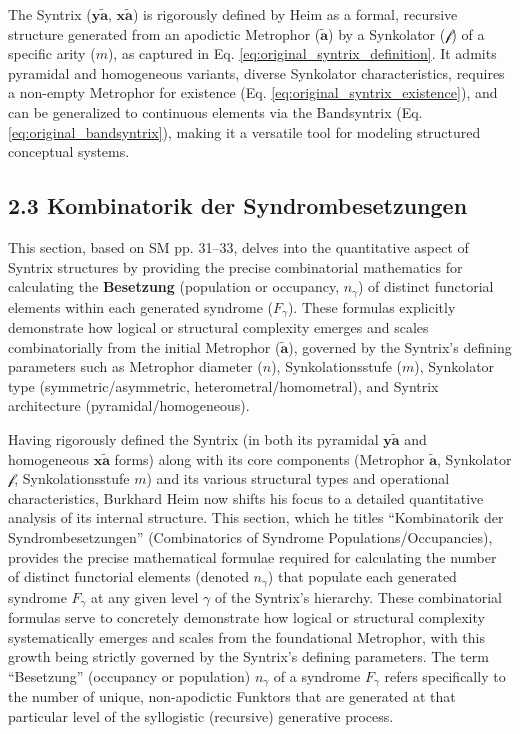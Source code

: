 \documentclass[12pt]{article}
\newcommand{\q}[1]{\enquote{#1}}
\newcommand{\syntrix}{\bm{y\widetilde{a}}}
\newcommand{\homogeneoussyntrix}{\bm{x\widetilde{a}}}
\newcommand{\metrophor}{\bm{\widetilde{a}}}
\newcommand{\synkolator}{\mathcal{f}}
\newcommand{\synkolationsstufe}{m}
\newcommand{\syndrom}{F}
\begin{document}
The Syntrix (\(\syntrix\), \(\homogeneoussyntrix\)) is rigorously defined by Heim as a formal, recursive structure generated from an apodictic Metrophor (\(\metrophor\)) by a Synkolator (\(\synkolator\)) of a specific arity (\(\synkolationsstufe\)), as captured in Eq. \eqref{eq:original_syntrix_definition}. It admits pyramidal and homogeneous variants, diverse Synkolator characteristics, requires a non-empty Metrophor for existence (Eq. \eqref{eq:original_syntrix_existence}), and can be generalized to continuous elements via the Bandsyntrix (Eq. \eqref{eq:original_bandsyntrix}), making it a versatile tool for modeling structured conceptual systems.

\subsection{2.3 Kombinatorik der Syndrombesetzungen}
\label{sec:kombinatorik}

This section, based on SM pp. 31--33, delves into the quantitative aspect of Syntrix structures by providing the precise combinatorial mathematics for calculating the \textbf{Besetzung} (population or occupancy, \(n_\gamma\)) of distinct functorial elements within each generated syndrome (\(\syndrom_\gamma\)). These formulas explicitly demonstrate how logical or structural complexity emerges and scales combinatorially from the initial Metrophor (\(\metrophor\)), governed by the Syntrix's defining parameters such as Metrophor diameter (\(n\)), Synkolationsstufe (\(\synkolationsstufe\)), Synkolator type (symmetric/asymmetric, heterometral/homometral), and Syntrix architecture (pyramidal/homogeneous).

Having rigorously defined the Syntrix (in both its pyramidal \( \syntrix \) and homogeneous \( \homogeneoussyntrix \) forms) along with its core components (Metrophor \( \metrophor \), Synkolator \( \synkolator \), Synkolationsstufe \( \synkolationsstufe \)) and its various structural types and operational characteristics, Burkhard Heim now shifts his focus to a detailed quantitative analysis of its internal structure. This section, which he titles \q{Kombinatorik der Syndrombesetzungen} (Combinatorics of Syndrome Populations/Occupancies), provides the precise mathematical formulae required for calculating the number of distinct functorial elements (denoted \( n_\gamma \)) that populate each generated syndrome \( \syndrom_\gamma \) at any given level \( \gamma \) of the Syntrix's hierarchy. These combinatorial formulas serve to concretely demonstrate how logical or structural complexity systematically emerges and scales from the foundational Metrophor, with this growth being strictly governed by the Syntrix's defining parameters. The term \q{Besetzung} (occupancy or population) \( n_\gamma \) of a syndrome \( \syndrom_\gamma \) refers specifically to the number of unique, non-apodictic Funktors that are generated at that particular level of the syllogistic (recursive) generative process.
\end{document}
